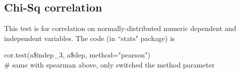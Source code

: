 \documentclass[../note.tex]{subfiles} %
\begin{document}
\subsection{Chi-Sq correlation}
This test is for correlation on normally-distributed numeric dependent and independent variables.  The code (in ``stats" package\autocite{Rcore}) is
\begin{code}
cor.test(a\$indep\_3, a\$dep, method="pearson")\\
\# same with spearman above, only switched the method parameter
\end{code}
\end{document}
